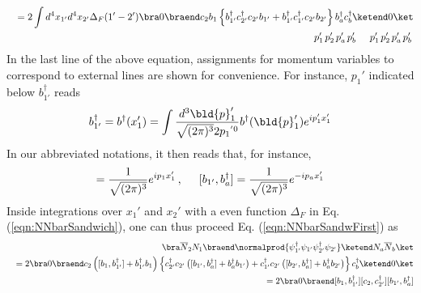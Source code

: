 {\begin{eqnarray}
&&=
2 \int d^4 x_{1'} d^4 x_{2'} \Delta_F(1' - 2')
\bra 0 \braend c_2 b_1
\left\{
b_{1'}^\dagger
c_{2'}^\dagger
c_{2'} 
b_{1'}
+
b_{1'}^\dagger
c_{1'}^\dagger
c_{2'} 
b_{2'}
\right\}
b_a^\dagger c_b^\dagger 
\ketend 0 \ket
\nonumber\\
&&
\hspace{56mm}
p_1'
\,
p_2'
\,
p_a'
\,
p_b'
\hspace{5mm}
p_1'
\,
p_2'
\,
p_a'
\,
p_b'
\,
\label{eqn:NNbarSandwich}
\end{eqnarray}
In the last line of the above equation, assignments for momentum variables
to correspond to external lines are shown for convenience. 
For instance, $p_1'$  indicated below $b_{1'}^\dagger$ reads
\begin{eqnarray}
b_{1'}^\dagger = b^\dagger(x_{1}')
=
\int \frac{d^3 \bld{p}_{1}'}{\sqrt{(2\pi)^3} 2 {p_{1}}^{'0}}
b^\dagger(\bld{p}_{1}') 
e^{i p_{1}' x_{1}'}
\end{eqnarray}
In our abbreviated notations, it then reads that, for instance,
\begin{eqnarray}
[b_1, b_{1'}^\dagger]
=
\frac{1}{\sqrt{(2\pi)^3}} e^{i p_1 x_1'}\,,
\hspace{5mm}
[b_{1'}, b^\dagger_{a}]
=
\frac{1}{\sqrt{(2\pi)^3}} e^{-i p_a x_1'}
\end{eqnarray}
Inside integrations over $x_1'$ and $x_2'$ with a even function $\Delta_F$ 
in  Eq. (\ref{eqn:NNbarSandwich}),
one can thus proceed Eq. (\ref{eqn:NNbarSandwFirst}) 
as
\begin{eqnarray}
&&
\bra \overline{N}_2 N_1 \braend 
\normalprod{\psi_{1'}^\dagger \psi_{1'} \psi_{2'}^\dagger \psi_{2'}}
\ketend N_a \overline{N}_b \ket
\nonumber\\
&&=
2 \bra 0 \braend c_2 
\left( [b_1, b_{1'}^\dagger] + b_{1'}^\dagger b_1 \right)
\left\{
c_{2'}^\dagger
c_{2'} 
\left( [b_{1'}, b_{a}^\dagger] + b_{a}^\dagger b_{1'} \right)
+
c_{1'}^\dagger
c_{2'} 
\left( [b_{2'}, b_{a}^\dagger] + b_{a}^\dagger b_{2'} \right)
\right\}
c_b^\dagger 
\ketend 0 \ket
\nonumber\\
&&=
2 \bra 0 \braend 
[b_1, b_{1'}^\dagger] 
[c_2, c_{2'}^\dagger] 
[b_{1'}, b_{a}^\dagger]

\end{eqnarray}}
